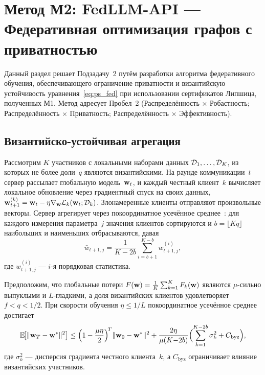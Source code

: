 \section{Метод М2: FedLLM-API --- Федеративная оптимизация графов с приватностью}
\label{sec:fedllm}

Данный раздел решает Подзадачу~2 путём разработки алгоритма федеративного обучения, обеспечивающего ограничение приватности и византийскую устойчивость уравнения~\eqref{eq:ps_fed} при использовании сертификатов Липшица, полученных М1. Метод адресует Пробел~2 (Распределённость $\times$ Робастность; Распределённость $\times$ Приватность; Распределённость $\times$ Эффективность).

\subsection{Византийско-устойчивая агрегация}

Рассмотрим $K$ участников с локальными наборами данных $\mathcal{D}_1,\dots,\mathcal{D}_K$, из которых не более доли~$q$ являются византийскими. На раунде коммуникации~$t$ сервер рассылает глобальную модель~$\mathbf{w}_t$, и каждый честный клиент~$k$ вычисляет локальное обновление через градиентный спуск на своих данных, $\mathbf{w}_{t+1}^{(k)}=\mathbf{w}_t - \eta\nabla_{\mathbf{w}}\mathcal{L}_k(\mathbf{w}_t;\mathcal{D}_k)$. Злонамеренные клиенты отправляют произвольные векторы. Сервер агрегирует через покоординатное усечённое среднее~\cite{Yin2018,Blanchard2017,Li2020fedprox}: для каждого измерения параметра~$j$ значения клиентов сортируются и $b=\lfloor Kq\rfloor$ наибольших и наименьших отбрасываются, давая
\begin{equation}
\bar{w}_{t+1,j}
= \frac{1}{K-2b}\sum_{i=b+1}^{K-b}w_{t+1,j}^{(i)},
\label{eq:fed_trim}
\end{equation}
где $w_{t+1,j}^{(i)}$ --- $i$-я порядковая статистика.

\begin{theorem}
\label{thm:fed_conv}
Предположим, что глобальные потери $F(\mathbf{w})=\frac{1}{K}\sum_{k=1}^K F_k(\mathbf{w})$ являются $\mu$-сильно выпуклыми и $L$-гладкими, а доля византийских клиентов удовлетворяет $f<q<1/2$. При скорости обучения $\eta\le 1/L$ покоординатное усечённое среднее достигает
\begin{equation}
\mathbb{E}\!\bigl[\|\mathbf{w}_T-\mathbf{w}^*\|^2\bigr]
\le \Bigl(1-\frac{\mu\eta}{2}\Bigr)^{\!T}\|\mathbf{w}_0-\mathbf{w}^*\|^2
  + \frac{2\eta}{\mu(K{-}2b)}
    \Bigl(\sum_{k=1}^{K-2b}\sigma_k^2 + C_{\mathrm{byz}}\Bigr),
\label{eq:fed_conv_bound}
\end{equation}
где $\sigma_k^2$ --- дисперсия градиента честного клиента~$k$, а $C_{\mathrm{byz}}$ ограничивает влияние византийских участников.
\end{theorem}

